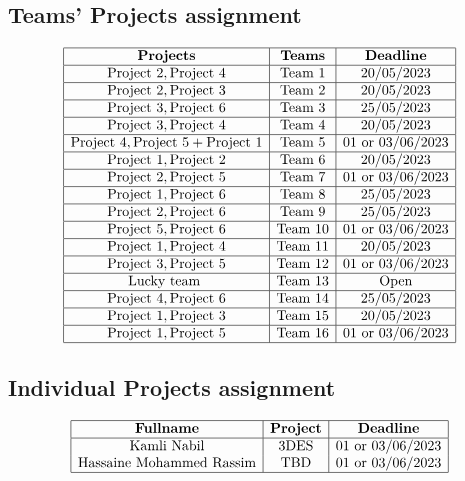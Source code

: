 \documentclass[12pt,addpoints]{exam}		%
\begin{document}
\section{}
\subsection*{\centering Teams' Projects assignment}

$$
\begin{array}{|c|c|c|}
\hline
\text{\bf Projects}&\text{\bf Teams}&\text{\bf Deadline}\\
\hline
 \text{Project 2},\text{Project 4} & \text{Team 1} & \text{20/05/2023}\\
     \hline
 \text{Project 2},\text{Project 3} & \text{Team 2} & \text{20/05/2023}\\
     \hline
 \text{Project 3},\text{Project 6} & \text{Team 3} & \text{25/05/2023}\\
     \hline
 \text{Project 3},\text{Project 4} & \text{Team 4} & \text{20/05/2023}\\
     \hline
 \text{Project 4},\text{Project 5} + \text{Project 1} & \text{Team 5} & \text{01 or 03/06/2023}\\
     \hline
 \text{Project 1},\text{Project 2} & \text{Team 6} & \text{20/05/2023}\\
     \hline
 \text{Project 2},\text{Project 5} & \text{Team 7} & \text{01 or 03/06/2023}\\
     \hline
 \text{Project 1},\text{Project 6} & \text{Team 8} & \text{25/05/2023}\\
     \hline
 \text{Project 2},\text{Project 6} & \text{Team 9} & \text{25/05/2023}\\
     \hline
 \text{Project 5},\text{Project 6} & \text{Team 10} & \text{01 or 03/06/2023}\\
     \hline
 \text{Project 1},\text{Project 4} & \text{Team 11} & \text{20/05/2023}\\
     \hline
 \text{Project 3},\text{Project 5} & \text{Team 12} & \text{01 or 03/06/2023}\\
     \hline
  \text{Lucky team }& \text{Team 13} & \text{Open}\\
     \hline
 \text{Project 4},\text{Project 6} & \text{Team 14} & \text{25/05/2023}\\
     \hline
 \text{Project 1},\text{Project 3} & \text{Team 15} & \text{20/05/2023}\\
     \hline
 \text{Project 1},\text{Project 5} & \text{Team 16} & \text{01 or 03/06/2023}\\
 \hline
\end{array}$$
\subsection*{\centering Individual Projects assignment}
$$
\begin{array}{|c|c|c|}
\hline
\text{\bf Fullname}&\text{\bf Project}&\text{\bf Deadline}\\
\hline
\text{Kamli Nabil} & \text{3DES} & \text{01 or 03/06/2023}\\
\text{Hassaine Mohammed Rassim} & \text{TBD} & \text{01 or 03/06/2023}\\
\hline
\end{array}$$
\end{document}
